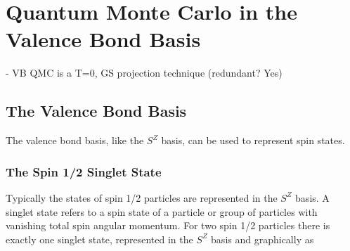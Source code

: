 \chapter{Quantum Monte Carlo in the Valence Bond Basis}


{\color{red} - VB QMC is a T=0, GS projection technique (redundant? Yes)}
\\
\section{The Valence Bond Basis}

{\color{red} The valence bond basis, like the $S^Z$ basis, can be used to represent spin states.}
\subsection{The Spin 1/2 Singlet State}

Typically the states of spin 1/2 particles are represented in the $S^Z$ basis.  
A singlet state refers to a spin state of a particle or group of particles with vanishing total spin angular momentum.
For two spin 1/2 particles there is exactly one singlet state, represented in the $S^Z$ basis and graphically as

